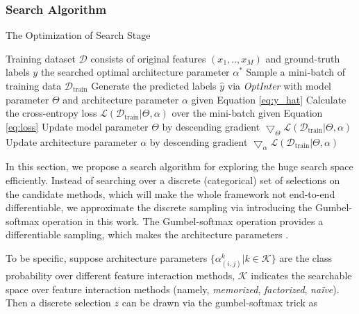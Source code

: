 \documentclass[conference]{IEEEtran}
\begin{document}
\subsubsection{Search Algorithm}

\begin{algorithm}
	\caption{The Optimization of Search Stage} 
    \label{alg:search}
	\begin{algorithmic}[1]
		\Require Training dataset $\mathcal{D}$ consists of original features $(x_1, .., x_M)$ and ground-truth labels $y$
        \Ensure the searched optimal architecture parameter $\alpha^{*}$
            \State Sample a mini-batch of training data $\mathcal{D}_{\text{train}}$
            \State Generate the predicted labels $\hat{y}$ via \textit{OptInter} with \Statex \qquad model parameter $\Theta$ and architecture parameter $\alpha$ 
            \Statex \qquad given Equation \ref{eq:y_hat}
            \State Calculate the cross-entropy loss $\mathcal{L}(\mathcal{D}_{\text{train}}|\Theta, \alpha)$ over 
            \Statex \qquad the mini-batch given Equation \ref{eq:loss}
            \State Update model parameter $\Theta$ by descending gradient 
            \Statex \qquad $\bigtriangledown_{\Theta} \mathcal{L}(\mathcal{D}_{\text{train}}|\Theta, \alpha)$
            \State Update architecture parameter $\alpha$ by descending 
            \Statex \qquad gradient $\bigtriangledown_{\alpha} \mathcal{L}(\mathcal{D}_{\text{train}}|\Theta, \alpha)$
        \EndWhile
	\end{algorithmic}
\end{algorithm}

In this section, we propose a search algorithm for exploring the huge search space efficiently. Instead of searching over a discrete (categorical) set of selections on the candidate methods, which will make the whole framework not end-to-end differentiable, we approximate the discrete sampling via introducing the Gumbel-softmax operation\cite{Gumbel-Softmax} in this work. The Gumbel-softmax operation provides a differentiable sampling, which makes the architecture parameters .

To be specific, suppose architecture parameters $\{\alpha_{(i,j)}^k | k \in \mathcal{K} \}$ are the class probability over different feature interaction methods, $\mathcal{K}$ indicates the searchable space over feature interaction methods (namely, \emph{memorized}, \emph{factorized}, \emph{naïve}). Then a discrete selection $z$ can be drawn via the gumbel-softmax trick\cite{Gumbel-Softmax-dist} as
\end{document}
